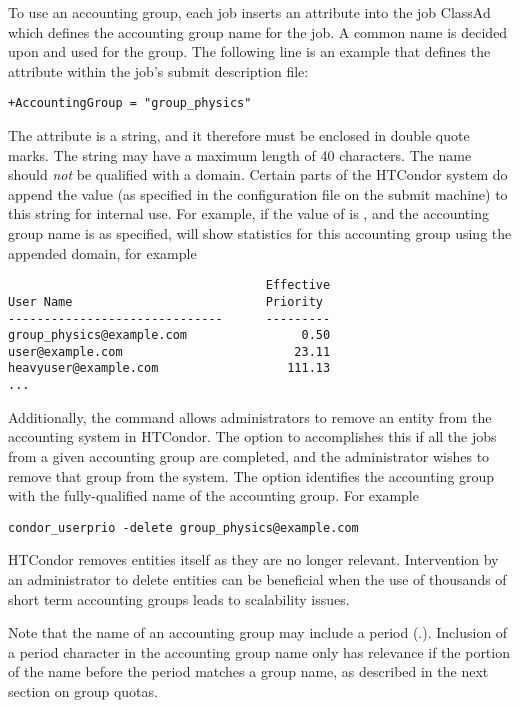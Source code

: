 To use an accounting group,
each job inserts an attribute into the job ClassAd which
defines the accounting group name for the job.
A common name is decided upon and used for the group.
The following line is an example that defines the attribute
within the job's submit description file:
\begin{verbatim}
+AccountingGroup = "group_physics"
\end{verbatim}

The  attribute is a string,
and it therefore must be enclosed in double quote marks.
The string may have a maximum length of 40 characters.
The name should \emph{not} be qualified with a domain.
Certain parts of the HTCondor system 
do append the value 
(as specified in the configuration file on the submit machine)
to this string for internal use.
For example, if the value of  is
, and the accounting group name
is as specified,
 will show statistics
for this accounting group using the appended domain, for example
\footnotesize
\begin{verbatim}
                                    Effective
User Name                           Priority
------------------------------      ---------
group_physics@example.com                0.50
user@example.com                        23.11
heavyuser@example.com                  111.13
...
\end{verbatim}
\normalsize

Additionally, the  command allows administrators to
remove an entity from the accounting system in HTCondor.
The  option to 
accomplishes this
if all the jobs from a given accounting group are completed,
and the administrator wishes to remove that group from the system.
The  option
identifies the accounting group with the fully-qualified name
of the accounting group.
For example
\footnotesize
\begin{verbatim}
condor_userprio -delete group_physics@example.com
\end{verbatim}
\normalsize

HTCondor removes entities itself as they are no longer
relevant.
Intervention by an administrator to delete entities can
be beneficial when the use of thousands
of short term accounting groups leads to scalability
issues.

Note that the name of an accounting group may include a period (.).
Inclusion of a period character in the accounting group name
only has relevance if the portion of the name before the
period matches a group name,
as described in the next section on group quotas.


